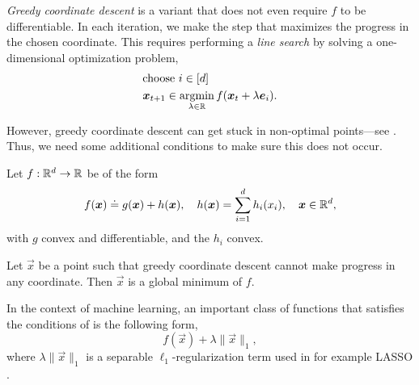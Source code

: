 \textit{Greedy coordinate descent} is a variant that does not even require $f$ to be differentiable.
In each iteration, we make the step that maximizes the progress in the chosen coordinate. This
requires performing a \textit{line search} by solving a one-dimensional optimization problem,
\begin{align*}
     & \text{choose $i \in [d]$}                                                    \\
     & \bm{x}_{t+1} \in \operatorname*{argmin}_{\lambda \in \mathbb{R}} f(\bm{x}_t + \lambda \bm{e}_i).
\end{align*}

However, greedy coordinate descent can get stuck in non-optimal points---see
. Thus, we need some additional conditions to make sure this does not occur.

\begin{theorem} \label{thm:separable}
    Let $f: \mathbb{R}^d \to \mathbb{R}$ be of the form \[
        f(\bm{x}) \doteq g(\bm{x}) + h(\bm{x}), \quad h(\bm{x}) = \sum_{i=1}^{d} h_i(x_i), \quad \bm{x} \in \mathbb{R}^d,
    \]
    with $g$ convex and differentiable, and the $h_i$ convex.

    Let $\vec{x}$ be a point such that greedy coordinate descent cannot make progress in any
    coordinate. Then $\vec{x}$ is a global minimum of $f$.
\end{theorem}

In the context of machine learning, an important class of functions that satisfies the conditions
of  is the following form, \[
    f(\vec{x}) + \lambda \| \vec{x} \|_1,
\]
where $\lambda \| \vec{x} \|_1$ is a separable $\ell_1$-regularization term used in for example
LASSO \citep{tibshirani1996regression}.
